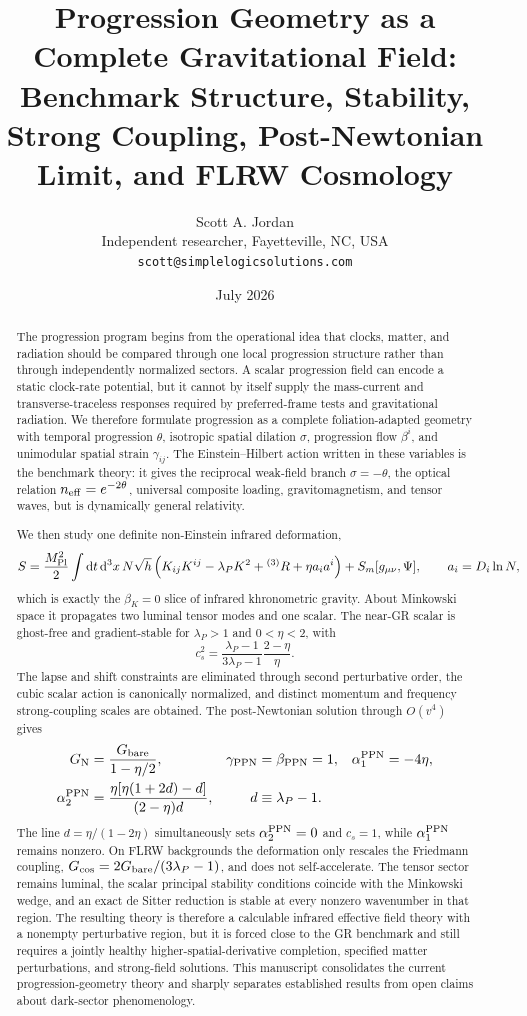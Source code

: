 \documentclass[11pt]{article}
\title{Progression Geometry as a Complete Gravitational Field:\\
Benchmark Structure, Stability, Strong Coupling, Post-Newtonian Limit, and FLRW Cosmology}
\author{Scott A. Jordan\\
Independent researcher, Fayetteville, NC, USA\\
\texttt{scott@simplelogicsolutions.com}}
\date{July 2026}
\newcommand{\Mpl}{M_{\rm Pl}}
\newcommand{\GN}{G_{\rm N}}
\newcommand{\Gc}{G_{\rm cos}}
\newcommand{\Gb}{G_{\rm bare}}
\newcommand{\dd}{\mathrm{d}}
\newcommand{\cs}{c_s}
\newcommand{\Rthree}{{}^{(3)}R}
\newcommand{\aone}{\alpha_1^{\rm PPN}}
\newcommand{\atwo}{\alpha_2^{\rm PPN}}
\newcommand{\bppn}{\beta_{\rm PPN}}
\newcommand{\gppn}{\gamma_{\rm PPN}}
\begin{document}
\maketitle

\begin{abstract}
The progression program begins from the operational idea that clocks, matter, and radiation should be compared through one local progression structure rather than through independently normalized sectors.  A scalar progression field can encode a static clock-rate potential, but it cannot by itself supply the mass-current and transverse-traceless responses required by preferred-frame tests and gravitational radiation.  We therefore formulate progression as a complete foliation-adapted geometry with temporal progression $\theta$, isotropic spatial dilation $\sigma$, progression flow $\beta^i$, and unimodular spatial strain $\gamma_{ij}$.  The Einstein--Hilbert action written in these variables is the benchmark theory: it gives the reciprocal weak-field branch $\sigma=-\theta$, the optical relation $n_{\rm eff}=e^{-2\theta}$, universal composite loading, gravitomagnetism, and tensor waves, but is dynamically general relativity.

We then study one definite non-Einstein infrared deformation,
\[
S=\frac{\Mpl^2}{2}\int \dd t\,\dd^3x\,N\sqrt h
\left(K_{ij}K^{ij}-\lambda_P K^2+\Rthree+\eta a_i a^i\right)+S_m[g_{\mu\nu},\Psi],
\qquad a_i=D_i\ln N,
\]
which is exactly the $\beta_K=0$ slice of infrared khronometric gravity.  About Minkowski space it propagates two luminal tensor modes and one scalar.  The near-GR scalar is ghost-free and gradient-stable for $\lambda_P>1$ and $0<\eta<2$, with
\[
\cs^2=\frac{\lambda_P-1}{3\lambda_P-1}\frac{2-\eta}{\eta}.
\]
The lapse and shift constraints are eliminated through second perturbative order, the cubic scalar action is canonically normalized, and distinct momentum and frequency strong-coupling scales are obtained.  The post-Newtonian solution through $O(v^4)$ gives
\[
\begin{aligned}
\GN&=\frac{\Gb}{1-\eta/2}, &
\gppn&=\bppn=1, &
\aone&=-4\eta,\\
\atwo&=\frac{\eta[\eta(1+2d)-d]}{(2-\eta)d}, &
d&\equiv\lambda_P-1.
\end{aligned}
\]
The line $d=\eta/(1-2\eta)$ simultaneously sets $\atwo=0$ and $\cs=1$, while $\aone$ remains nonzero.  On FLRW backgrounds the deformation only rescales the Friedmann coupling, $\Gc=2\Gb/(3\lambda_P-1)$, and does not self-accelerate.  The tensor sector remains luminal, the scalar principal stability conditions coincide with the Minkowski wedge, and an exact de Sitter reduction is stable at every nonzero wavenumber in that region.  The resulting theory is therefore a calculable infrared effective field theory with a nonempty perturbative region, but it is forced close to the GR benchmark and still requires a jointly healthy higher-spatial-derivative completion, specified matter perturbations, and strong-field solutions.  This manuscript consolidates the current progression-geometry theory and sharply separates established results from open claims about dark-sector phenomenology.
\end{abstract}
\end{document}
